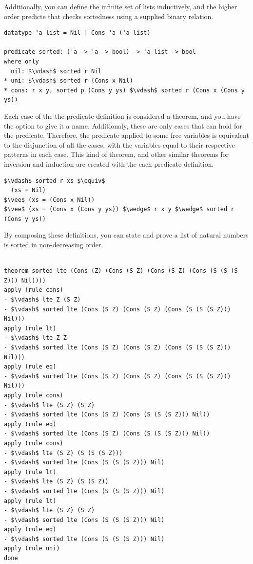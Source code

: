 \documentclass[letterpaper, 11pt]{extarticle}
\begin{document}
Additionally, you can define the infinite set of lists inductively, and the higher order predicte that checks
sortedness using a supplied binary relation.

\begin{lstlisting}[language=logic]
datatype 'a list = Nil | Cons 'a ('a list)

predicate sorted: ('a -> 'a -> bool) -> 'a list -> bool
where only
  nil: $\vdash$ sorted r Nil
* uni: $\vdash$ sorted r (Cons x Nil)
* cons: r x y, sorted p (Cons y ys) $\vdash$ sorted r (Cons x (Cons y ys))
\end{lstlisting}

Each case of the the predicate definition is considered a theorem, and you have the option to give it a name. 
Additionaly, these are only cases that can hold for the predicate.  Therefore, the predicate applied to some free
variables is equivalent to the disjunction of all the cases, with the variables equal to their respective patterns
in each case. This kind of theorem, and other similar theorems for inversion and induction
are created with the each predicate definition.

\begin{lstlisting}[language=logic]
$\vdash$ sorted r xs $\equiv$
  (xs = Nil)
$\vee$ (xs = (Cons x Nil))
$\vee$ (xs = (Cons x (Cons y ys)) $\wedge$ r x y $\wedge$ sorted r (Cons y ys))
\end{lstlisting}

By composing these definitions, you can state and prove a list of natural numbers is sorted in non-decreasing order.

\begin{lstlisting}[language=logic]

theorem sorted lte (Cons (Z) (Cons (S Z) (Cons (S Z) (Cons (S (S (S Z))) Nil))))
apply (rule cons)
- $\vdash$ lte Z (S Z)
- $\vdash$ sorted lte (Cons (S Z) (Cons (S Z) (Cons (S (S (S Z))) Nil)))
apply (rule lt)
- $\vdash$ lte Z Z
- $\vdash$ sorted lte (Cons (S Z) (Cons (S Z) (Cons (S (S (S Z))) Nil)))
apply (rule eq)
- $\vdash$ sorted lte (Cons (S Z) (Cons (S Z) (Cons (S (S (S Z))) Nil)))
apply (rule cons)
- $\vdash$ lte (S Z) (S Z)
- $\vdash$ sorted lte (Cons (S Z) (Cons (S (S (S Z))) Nil))
apply (rule eq)
- $\vdash$ sorted lte (Cons (S Z) (Cons (S (S (S Z))) Nil))
apply (rule cons)
- $\vdash$ lte (S Z) (S (S (S Z)))
- $\vdash$ sorted lte (Cons (S (S (S Z))) Nil)
apply (rule lt)
- $\vdash$ lte (S Z) (S (S Z))
- $\vdash$ sorted lte (Cons (S (S (S Z))) Nil)
apply (rule lt)
- $\vdash$ lte (S Z) (S Z)
- $\vdash$ sorted lte (Cons (S (S (S Z))) Nil)
apply (rule eq)
- $\vdash$ sorted lte (Cons (S (S (S Z))) Nil)
apply (rule uni)
done
\end{lstlisting}
\end{document}

